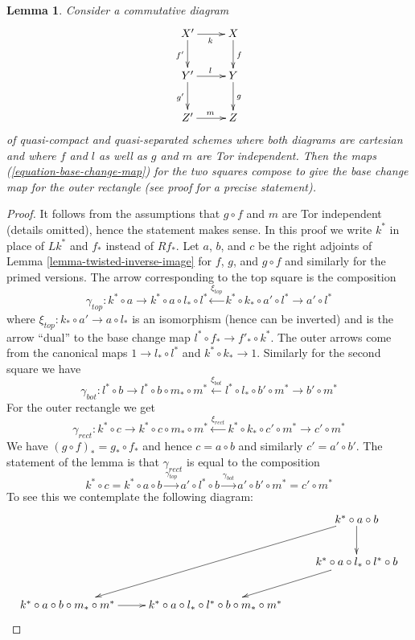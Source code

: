 \documentclass{stacks-project}
\theoremstyle{plain}
\newtheorem{lemma}[subsection]{Lemma}
\theoremstyle{definition}
\theoremstyle{remark}
\numberwithin{equation}{subsection}
\begin{document}
\begin{lemma}
\label{lemma-compose-base-change-maps}
Consider a commutative diagram
$$
\xymatrix{
X' \ar[r]_k \ar[d]_{f'} & X \ar[d]^f \\
Y' \ar[r]^l \ar[d]_{g'} & Y \ar[d]^g \\
Z' \ar[r]^m & Z
}
$$
of quasi-compact and quasi-separated schemes where
both diagrams are cartesian and where $f$ and $l$
as well as $g$ and $m$ are Tor independent.
Then the maps (\ref{equation-base-change-map})
for the two squares compose to give the base
change map for the outer rectangle (see proof for a precise statement).
\end{lemma}

\begin{proof}
It follows from the assumptions that $g \circ f$ and $m$ are Tor
independent (details omitted), hence the statement makes sense.
In this proof we write $k^*$ in place of $Lk^*$ and $f_*$ instead
of $Rf_*$. Let $a$, $b$, and $c$ be the right adjoints of
Lemma \ref{lemma-twisted-inverse-image}
for $f$, $g$, and $g \circ f$ and similarly for the primed versions.
The arrow corresponding to the top square is the composition
$$
\gamma_{top} :
k^* \circ a \to k^* \circ a \circ l_* \circ l^*
\xleftarrow{\xi_{top}} k^* \circ k_* \circ a' \circ l^* \to a' \circ l^*
$$
where $\xi_{top} : k_* \circ a' \to a \circ l_*$
is an isomorphism (hence can be inverted)
and is the arrow ``dual'' to the base change map
$l^* \circ f_* \to f'_* \circ k^*$. The outer arrows come
from the canonical maps $1 \to l_* \circ l^*$ and $k^* \circ k_* \to 1$.
Similarly for the second square we have
$$
\gamma_{bot} :
l^* \circ b \to l^* \circ b \circ m_* \circ m^*
\xleftarrow{\xi_{bot}} l^* \circ l_* \circ b' \circ m^* \to b' \circ m^*
$$
For the outer rectangle we get
$$
\gamma_{rect} :
k^* \circ c \to k^* \circ c \circ m_* \circ m^*
\xleftarrow{\xi_{rect}} k^* \circ k_* \circ c' \circ m^* \to c' \circ m^*
$$
We have $(g \circ f)_* = g_* \circ f_*$ and hence
$c = a \circ b$ and similarly $c' = a' \circ b'$.
The statement of the lemma is that $\gamma_{rect}$
is equal to the composition
$$
k^* \circ c = k^* \circ a \circ b \xrightarrow{\gamma_{top}}
a' \circ l^* \circ b \xrightarrow{\gamma_{bot}}
a' \circ b' \circ m^* = c' \circ m^*
$$
To see this we contemplate the following diagram:
$$
\xymatrix{
& & k^* \circ a \circ b \ar[d] \ar[lldd] \\
& & k^* \circ a \circ l_* \circ l^* \circ b \ar[ld] \\
k^* \circ a \circ b \circ m_* \circ m^* \ar[r] &
k^* \circ a \circ l_* \circ l^* \circ b \circ m_* \circ m^* &
}$$
\end{proof}
\end{document}
